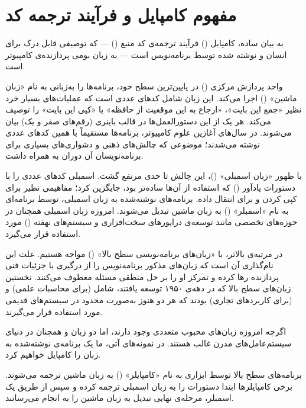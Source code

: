 \section{مفهوم کامپایل و فرآیند ترجمه کد}

به بیان ساده، کامپایل () فرآیند ترجمه‌ی کد منبع () — که توصیفی قابل درک برای انسان و نوشته شده توسط برنامه‌نویس است — به زبان بومی پردازنده‌ی کامپیوتر است.

واحد پردازش مرکزی () در پایین‌ترین سطح خود، برنامه‌ها را به‌زبانی به نام «زبان ماشین» () اجرا می‌کند. این زبان شامل کدهای عددی است که عملیات‌های بسیار خرد نظیر «جمع این بایت»، «ارجاع به این موقعیت از حافظه» یا «کپی این بایت» را توصیف می‌کند. هر یک از این دستورالعمل‌ها در قالب باینری (رقم‌های صفر و یک) بیان می‌شوند. در سال‌های آغازین علوم کامپیوتر، برنامه‌ها مستقیماً با همین کدهای عددی نوشته می‌شدند؛ موضوعی که چالش‌های ذهنی و دشواری‌های بسیاری برای برنامه‌نویسان آن دوران به همراه داشت.

با ظهور «زبان اسمبلی» ()، این چالش تا حدی مرتفع گشت. اسمبلی کدهای عددی را با دستورات یادآور () که استفاده از آن‌ها ساده‌تر بود، جایگزین کرد؛ مفاهیمی نظیر  برای کپی کردن و  برای انتقال داده. برنامه‌های نوشته‌شده به زبان اسمبلی، توسط برنامه‌ای به نام «اسمبلر» () به زبان ماشین تبدیل می‌شوند. امروزه زبان اسمبلی همچنان در حوزه‌های تخصصی مانند توسعه‌ی درایورهای سخت‌افزاری و سیستم‌های نهفته () مورد استفاده قرار می‌گیرد.

در مرتبه‌ی بالاتر، با «زبان‌های برنامه‌نویسی سطح بالا» () مواجه هستیم. علت این نام‌گذاری آن است که زبان‌های مذکور برنامه‌نویس را از درگیری با جزئیات فنی پردازنده رها کرده و تمرکز او را بر حل منطقی مسئله معطوف می‌کنند. نخستین زبان‌های سطح بالا که در دهه‌ی ۱۹۵۰ توسعه یافتند، شامل  (برای محاسبات علمی) و  (برای کاربردهای تجاری) بودند که هر دو هنوز به‌صورت محدود در سیستم‌های قدیمی مورد استفاده قرار می‌گیرند.

اگرچه امروزه زبان‌های محبوب متعددی وجود دارند، اما دو زبان  و  همچنان در دنیای سیستم‌عامل‌های مدرن غالب هستند. در نمونه‌های آتی، ما یک برنامه‌ی نوشته‌شده به زبان  را کامپایل خواهیم کرد.

برنامه‌های سطح بالا توسط ابزاری به نام «کامپایلر» () به زبان ماشین ترجمه می‌شوند. برخی کامپایلرها ابتدا دستورات را به زبان اسمبلی ترجمه کرده و سپس از طریق یک اسمبلر، مرحله‌ی نهایی تبدیل به زبان ماشین را به انجام می‌رسانند.

